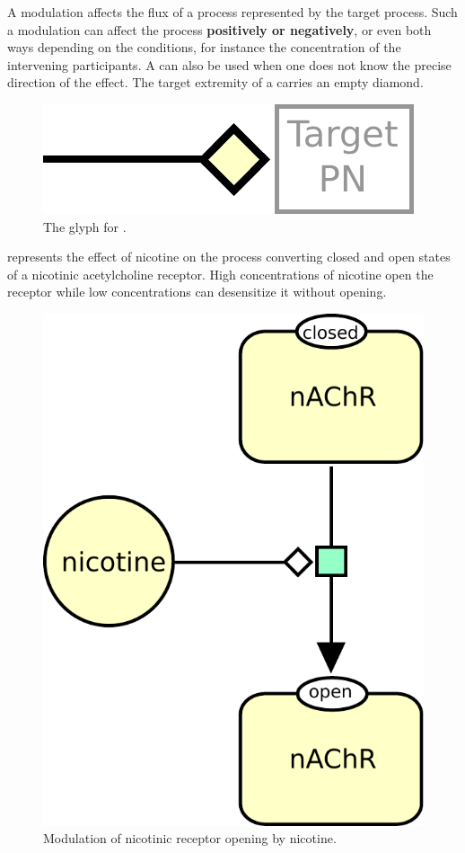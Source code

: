 A modulation affects the flux of a process represented by the target process. Such a modulation can affect the
process \textbf{positively or negatively}, or even both ways depending on the conditions, for instance the concentration of the intervening
participants. A  can also be used when one does not know the precise direction of the effect. The target extremity of a  carries an empty diamond.

\begin{figure}[htb]
  \centering
  \includegraphics[scale = 0.5]{le_images/modulation}
  \caption{The \PD glyph for .}
  \label{fig:modulation}
\end{figure}

 represents the effect of nicotine on the process converting closed and open states of a nicotinic acetylcholine receptor. High concentrations of nicotine open the receptor while low concentrations can desensitize it without opening. 

\begin{figure}[htb]
  \centering
  \includegraphics[scale = 0.5]{le_images/modulation-nAChR}
  \caption{Modulation of nicotinic receptor opening by nicotine.}
  \label{fig:modul-nico}
\end{figure}


